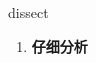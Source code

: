 
\begin{frame}
{\huge dissect}
\begin{center}
\begin{enumerate}\Large
  \item \textbf{仔细分析}
\end{enumerate}
\end{center}
\end{frame}

